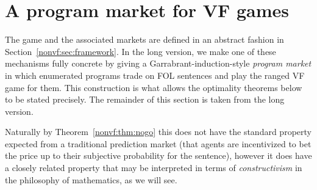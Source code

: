 \section{A program market for VF games}
\label{nonvf:sec:market}

\begin{draftblock}
The game and the associated markets are defined in an abstract fashion in Section~\ref{nonvf:sec:framework}. In the long version, we make one of these mechanisms fully concrete by giving a Garrabrant-induction-style \emph{program market} in which enumerated programs trade on FOL sentences and play the ranged VF game for them. This construction is what allows the optimality theorems below to be stated precisely. The remainder of this section is taken from the long version.
\end{draftblock}

Naturally by Theorem~\ref{nonvf:thm:nogo} this does not have the standard property expected from a traditional prediction market (that agents are incentivized to bet the price up to their subjective probability for the sentence), however it does have a closely related property that may be interpreted in terms of \emph{constructivism} in the philosophy of mathematics, as we will see.

